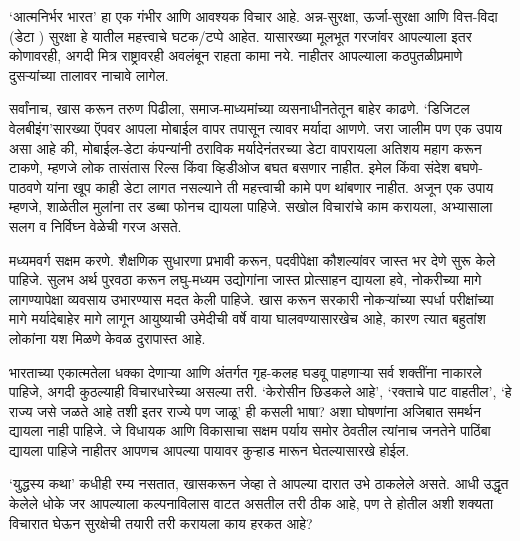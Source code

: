 `आत्मनिर्भर भारत' हा एक गंभीर आणि आवश्यक विचार आहे. अन्न-सुरक्षा, ऊर्जा-सुरक्षा आणि वित्त-विदा (डेटा ) सुरक्षा हे यातील महत्त्वाचे  घटक/टप्पे आहेत. यासारख्या मूलभूत गरजांवर आपल्याला इतर कोणावरही, अगदी मित्र राष्ट्रावरही अवलंबून राहता कामा नये. नाहीतर आपल्याला कठपुतळीप्रमाणे दुसऱ्यांच्या तालावर नाचावे लागेल.

सर्वांनाच, खास करून तरुण पिढीला, समाज-माध्यमांच्या व्यसनाधीनतेतून बाहेर काढणे. `डिजिटल वेलबीइंग'सारख्या ऍपवर आपला मोबाईल वापर तपासून त्यावर मर्यादा आणणे. जरा जालीम पण एक उपाय असा आहे की, मोबाईल-डेटा कंपन्यांनी ठराविक मर्यादेनंतरच्या डेटा वापरायला अतिशय महाग करून टाकणे, म्हणजे लोक तासंतास रिल्स किंवा व्हिडीओज बघत बसणार नाहीत. इमेल किंवा संदेश बघणे-पाठवणे यांना खूप काही डेटा लागत नसल्याने ती महत्त्वाची कामे पण थांबणार नाहीत. अजून एक उपाय म्हणजे, शाळेतील मुलांना तर डब्बा फोनच द्यायला पाहिजे. सखोल विचारांचे काम करायला, अभ्यासाला सलग व निर्विघ्न वेळेची गरज असते.

मध्यमवर्ग सक्षम करणे. शैक्षणिक सुधारणा प्रभावी करून, पदवीपेक्षा कौशल्यांवर जास्त भर देणे सुरू केले पाहिजे. सुलभ अर्थ पुरवठा करून लघु-मध्यम उद्योगांना जास्त प्रोत्साहन द्यायला हवे, नोकरीच्या मागे लागण्यापेक्षा व्यवसाय उभारण्यास मदत केली पाहिजे. खास करून सरकारी नोकऱ्यांच्या स्पर्धा परीक्षांच्या मागे मर्यादेबाहेर मागे लागून आयुष्याची उमेदीची वर्षे वाया घालवण्यासारखेच आहे, कारण त्यात बहुतांश लोकांना यश मिळणे केवळ दुरापास्त आहे.

भारताच्या एकात्मतेला धक्का देणाऱ्या आणि अंतर्गत गृह-कलह घडवू पाहणाऱ्या सर्व शक्तींना नाकारले पाहिजे, अगदी कुठल्याही विचारधारेच्या असल्या तरी. `केरोसीन छिडकले आहे', `रक्ताचे पाट वाहतील', `हे राज्य जसे जळते आहे तशी इतर राज्ये पण जाळू' ही कसली भाषा? अशा घोषणांना अजिबात समर्थन द्यायला नाही पाहिजे. जे विधायक आणि विकासाचा सक्षम पर्याय समोर ठेवतील त्यांनाच जनतेने पाठिंबा द्यायला पाहिजे नाहीतर आपणच आपल्या पायावर कुऱ्हाड मारून घेतल्यासारखे होईल.

`युद्धस्य कथा' कधीही रम्य नसतात, खासकरून जेव्हा ते आपल्या दारात उभे ठाकलेले असते. आधी उद्धृत केलेले धोके जर आपल्याला कल्पनाविलास वाटत असतील तरी ठीक आहे, पण ते होतील अशी शक्यता विचारात घेऊन सुरक्षेची तयारी तरी करायला काय हरकत आहे?